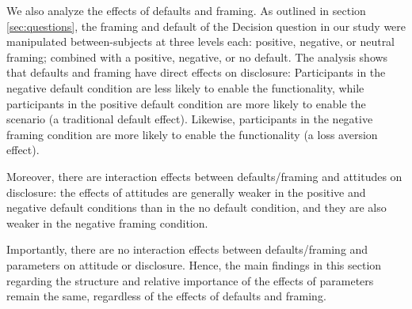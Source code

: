 We also analyze the effects of defaults and framing. As outlined in section \ref{sec:questions}, the framing and default of the Decision question in our study were manipulated between-subjects at three levels each: positive, negative, or neutral framing; combined with a positive, negative, or no default. The analysis shows that defaults and framing have direct effects on disclosure: Participants in the negative default condition are less likely to enable the functionality, while participants in the positive default condition are more likely to enable the scenario (a traditional default effect). Likewise, participants in the negative framing condition are more likely to enable the functionality (a loss aversion effect).

Moreover, there are interaction effects between defaults/framing and attitudes on disclosure: the effects of attitudes are generally weaker in the positive and negative default conditions than in the no default condition, and they are also weaker in the negative framing condition.

Importantly, there are no interaction effects between defaults/framing and parameters on attitude or disclosure. Hence, the main findings in this section regarding the structure and relative importance of the effects of parameters remain the same, regardless of the effects of defaults and framing.

